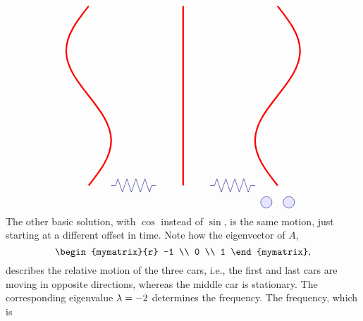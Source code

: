 \begin{solution}
\begin{itemize}
\begin{equation*}
\begin{tikzpicture}[scale=0.8, color=blue!50!black]
\begin{scope}[yshift=-8cm]
\begin{scope}[xshift=8.4cm]
            \draw[fill=blue!10] (2.5,0.25) circle (0.25);
            \draw[fill=blue!10] (3.5,0.25) circle (0.25);
          \end{scope}
          \begin{scope}[xshift=4cm]
            \draw (0,1) -- ++(0.2,0) -- ++(0.1,0.3)
            -- ++(0.2,-0.6) -- ++(0.2,0.6)
            -- ++(0.2,-0.6) -- ++(0.2,0.6)
            -- ++(0.2,-0.6) -- ++(0.2,0.6)
            -- ++(0.2,-0.6) -- ++(0.1,0.3)
            -- ++(0.2,0);
          \end{scope}
          \begin{scope}[xshift=8.4cm]
            \draw (0,1) -- ++(0.2,0) -- ++(0.1,0.3)
            -- ++(0.2,-0.6) -- ++(0.2,0.6)
            -- ++(0.2,-0.6) -- ++(0.2,0.6)
            -- ++(0.2,-0.6) -- ++(0.2,0.6)
            -- ++(0.2,-0.6) -- ++(0.1,0.3)
            -- ++(0.2,0);
          \end{scope}
        \end{scope}
        \begin{scope}[xshift=3cm,yshift=1cm,rotate=-90]
          \draw[ultra thick,red] (0,0) sin (2,-1) cos (4,0) sin (6,1) cos (8,0);
        \end{scope}
        \begin{scope}[xshift=7.2cm,yshift=1cm,rotate=-90]
          \draw[ultra thick,red] (0,0) sin (2,0) cos (4,0) sin (6,0) cos (8,0);
        \end{scope}
        \begin{scope}[xshift=11.4cm,yshift=1cm,rotate=-90]
          \draw[ultra thick,red] (0,0) sin (2,1) cos (4,0) sin (6,-1) cos (8,0);
        \end{scope}
      \end{tikzpicture}
    \end{equation*}
    The other basic solution, with $\cos$ instead of $\sin$, is the
    same motion, just starting at a different offset in time. Note how
    the eigenvector of $A$,
    \begin{equation*}
      \begin{mymatrix}{r} -1 \\ 0 \\ 1 \end{mymatrix},
    \end{equation*}
    describes the relative motion of the three cars, i.e., the first
    and last cars are moving in opposite directions, whereas the
    middle car is stationary. The corresponding eigenvalue
    $\lambda=-2$ determines the frequency. The frequency, which is

\end{itemize}
\end{solution}
